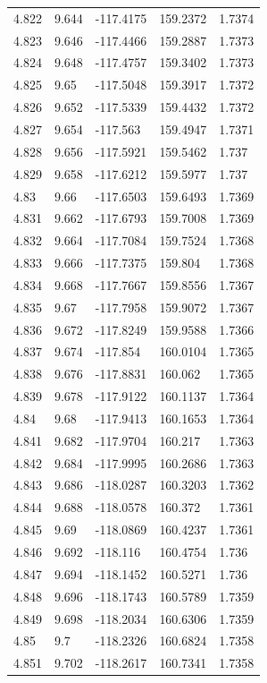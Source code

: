\begin{tabular}{lllll}
4.822 & 9.644 & -117.4175 & 159.2372 & 1.7374 \\
4.823 & 9.646 & -117.4466 & 159.2887 & 1.7373 \\
4.824 & 9.648 & -117.4757 & 159.3402 & 1.7373 \\
4.825 & 9.65 & -117.5048 & 159.3917 & 1.7372 \\
4.826 & 9.652 & -117.5339 & 159.4432 & 1.7372 \\
4.827 & 9.654 & -117.563 & 159.4947 & 1.7371 \\
4.828 & 9.656 & -117.5921 & 159.5462 & 1.737 \\
4.829 & 9.658 & -117.6212 & 159.5977 & 1.737 \\
4.83 & 9.66 & -117.6503 & 159.6493 & 1.7369 \\
4.831 & 9.662 & -117.6793 & 159.7008 & 1.7369 \\
4.832 & 9.664 & -117.7084 & 159.7524 & 1.7368 \\
4.833 & 9.666 & -117.7375 & 159.804 & 1.7368 \\
4.834 & 9.668 & -117.7667 & 159.8556 & 1.7367 \\
4.835 & 9.67 & -117.7958 & 159.9072 & 1.7367 \\
4.836 & 9.672 & -117.8249 & 159.9588 & 1.7366 \\
4.837 & 9.674 & -117.854 & 160.0104 & 1.7365 \\
4.838 & 9.676 & -117.8831 & 160.062 & 1.7365 \\
4.839 & 9.678 & -117.9122 & 160.1137 & 1.7364 \\
4.84 & 9.68 & -117.9413 & 160.1653 & 1.7364 \\
4.841 & 9.682 & -117.9704 & 160.217 & 1.7363 \\
4.842 & 9.684 & -117.9995 & 160.2686 & 1.7363 \\
4.843 & 9.686 & -118.0287 & 160.3203 & 1.7362 \\
4.844 & 9.688 & -118.0578 & 160.372 & 1.7361 \\
4.845 & 9.69 & -118.0869 & 160.4237 & 1.7361 \\
4.846 & 9.692 & -118.116 & 160.4754 & 1.736 \\
4.847 & 9.694 & -118.1452 & 160.5271 & 1.736 \\
4.848 & 9.696 & -118.1743 & 160.5789 & 1.7359 \\
4.849 & 9.698 & -118.2034 & 160.6306 & 1.7359 \\
4.85 & 9.7 & -118.2326 & 160.6824 & 1.7358 \\
4.851 & 9.702 & -118.2617 & 160.7341 & 1.7358 \\

\end{tabular}

